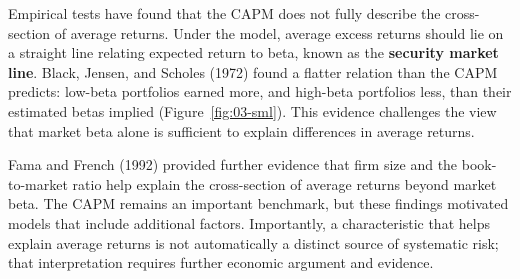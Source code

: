 Empirical tests have found that the CAPM does not fully describe the cross-section of average returns. Under the model, average excess returns should lie on a straight line relating expected return to beta, known as the \textbf{security market line}. Black, Jensen, and Scholes (1972) found a flatter relation than the CAPM predicts: low-beta portfolios earned more, and high-beta portfolios less, than their estimated betas implied (Figure~\ref{fig:03-sml}). This evidence challenges the view that market beta alone is sufficient to explain differences in average returns. 

Fama and French (1992) provided further evidence that firm size and the book-to-market ratio help explain the cross-section of average returns beyond market beta. The CAPM remains an important benchmark, but these findings motivated models that include additional factors. Importantly, a characteristic that helps explain average returns is not automatically a distinct source of systematic risk; that interpretation requires further economic argument and evidence.




